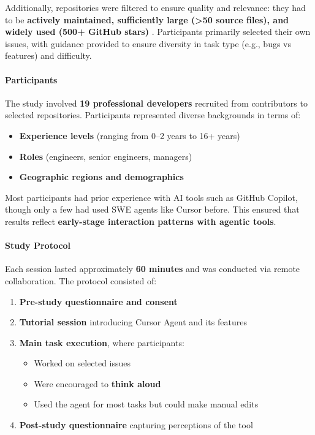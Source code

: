 Additionally, repositories were filtered to ensure quality and relevance: they had to be \textbf{actively maintained, sufficiently large (>50 source files), and widely used (500+ GitHub stars)} \cite{zhang2024bugreporttemplates, sens2025modelintegration}.  Participants primarily selected their own issues, with guidance provided to ensure diversity in task type (e.g., bugs vs features) and difficulty.

\paragraph{Participants}

The study involved \textbf{19 professional developers} recruited from contributors to selected repositories.  Participants represented diverse backgrounds in terms of:
\begin{itemize}
    \item \textbf{Experience levels} (ranging from 0–2 years to 16+ years)
    \item \textbf{Roles} (engineers, senior engineers, managers)
    \item \textbf{Geographic regions and demographics}
\end{itemize}

Most participants had prior experience with AI tools such as GitHub Copilot, though only a few had used SWE agents like Cursor before. This ensured that results reflect \textbf{early-stage interaction patterns with agentic tools}.

\paragraph{Study Protocol}
Each session lasted approximately \textbf{60 minutes} and was conducted via remote collaboration.  The protocol consisted of:

\begin{enumerate}
    \item  \textbf{Pre-study questionnaire and consent}
    \item \textbf{Tutorial session} introducing Cursor Agent and its features
    \item \textbf{Main task execution}, where participants:
          \begin{itemize}
              \item Worked on selected issues
              \item Were encouraged to \textbf{think aloud}
              \item Used the agent for most tasks but could make manual edits
          \end{itemize}
    \item \textbf{Post-study questionnaire} capturing perceptions of the tool
\end{enumerate}

